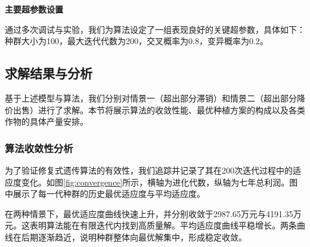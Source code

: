 \textbf{主要超参数设置}

通过多次调试与实验，我们为算法设定了一组表现良好的关键超参数，具体如下：种群大小为100，最大迭代代数为200，交叉概率为0.8，变异概率为0.2。


\subsection{求解结果与分析}

基于上述模型与算法，我们分别对情景一（超出部分滞销）和情景二（超出部分降价出售）进行了求解。本节将展示算法的收敛性能、最优种植方案的构成以及各类作物的具体产量安排。

\subsubsection{算法收敛性分析}


为了验证修复式遗传算法的有效性，我们追踪并记录了其在200次迭代过程中的适应度变化。如图\ref{fig:convergence}所示，横轴为进化代数，纵轴为七年总利润。图中展示了每一代种群的历史最优适应度与平均适应度。

在两种情景下，最优适应度曲线快速上升，并分别收敛于2987.65万元与4191.35万元。这表明算法能在有限迭代内找到高质量解。平均适应度曲线平稳增长。两条曲线在后期逐渐趋近，说明种群整体向最优解集中，形成稳定收敛。

